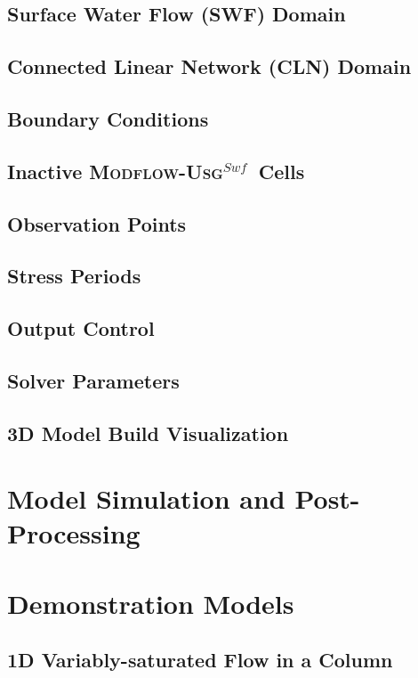 \documentclass[12pt,oneside,openany]{book}
\newcommand{\mfus}{\textsc{Modflow-Usg$^{Swf}$}}
\newcommand{\cln}{\textsf{CLN}}
\newcommand{\swf}{\textsf{SWF}}
\begin{document}
    \section{Surface Water Flow (\swf) Domain} 
    \section{Connected Linear Network (\cln) Domain} 
    \section{Boundary Conditions}
    \section{Inactive \mfus\ Cells} 
    \section{Observation Points} 
    \section{Stress Periods} 
    \section{Output Control} 
    \section{Solver Parameters} 
    \section{3D Model Build Visualization} 

\chapter{Model Simulation and Post-Processing}

\chapter{Demonstration Models}
    \section{1D Variably-saturated Flow in a Column} 
\end{document}
